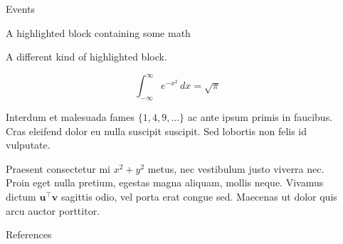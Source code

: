 \documentclass[final]{beamer}
\newlength{\sepwidth}
\newlength{\colwidth}
\newcommand{\separatorcolumn}{\begin{column}{\sepwidth}\end{column}}
\begin{document}
\begin{frame}[t]
\begin{columns}[t]
\begin{column}{\colwidth}
\begin{block}{Events}
  \end{block}


  \begin{exampleblock}{A highlighted block containing some math}

    A different kind of highlighted block.

    $$
    \int_{-\infty}^{\infty} e^{-x^2}\,dx = \sqrt{\pi}
    $$

    Interdum et malesuada fames $\{1, 4, 9, \ldots\}$ ac ante ipsum primis in
    faucibus. Cras eleifend dolor eu nulla suscipit suscipit. Sed lobortis non
    felis id vulputate.


    Praesent consectetur mi $x^2 + y^2$ metus, nec vestibulum justo viverra
    nec. Proin eget nulla pretium, egestas magna aliquam, mollis neque. Vivamus
    dictum $\mathbf{u}^\intercal\mathbf{v}$ sagittis odio, vel porta erat
    congue sed. Maecenas ut dolor quis arcu auctor porttitor.

  \end{exampleblock}

  \begin{block}{References}

    \nocite{*}
    \footnotesize{}

  \end{block}

\end{column}

\separatorcolumn

\end{columns}
\end{frame}
\end{document}
